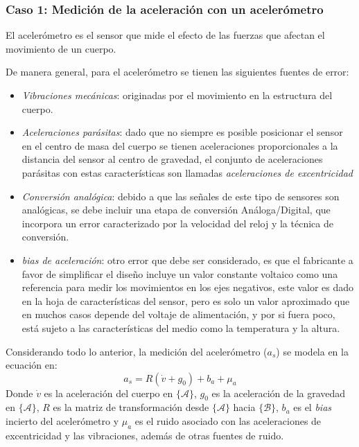 \documentclass[10pt]{report}
\numberwithin{equation}{chapter}
\numberwithin{algorithm}{chapter}
\newcommand{\bias}{\emph{bias} }
\newcommand{\marco}[1]{\{\mathcal{#1}\}}
\begin{document}
\subsubsection{Caso 1: Medición de la aceleración con un acelerómetro}
El acelerómetro es el sensor que mide el efecto de las fuerzas que afectan el movimiento de un cuerpo.\par
De manera general, para el acelerómetro se tienen las siguientes fuentes de error: 
\begin{itemize}
\item \emph{Vibraciones mecánicas}: originadas por el movimiento en la estructura del cuerpo.
\item \emph{Aceleraciones parásitas}: dado que no siempre es posible posicionar el sensor en el centro de masa del cuerpo se tienen aceleraciones proporcionales a la distancia del sensor al centro de gravedad, el conjunto de aceleraciones parásitas con estas características son llamadas \emph{aceleraciones de excentricidad}
\item \emph{Conversión analógica}: debido a que las señales de este tipo de sensores son analógicas, se debe incluir una etapa de conversión Análoga/Digital, que incorpora un error caracterizado por la velocidad del reloj y la técnica de conversión.
\item \emph{\bias de aceleración}: otro error que debe ser considerado, es que el fabricante a favor de simplificar el diseño incluye un valor constante voltaico como una referencia para medir los movimientos en los ejes negativos, este valor es dado en la hoja de características del sensor, pero es solo un valor aproximado que en muchos casos depende del voltaje de alimentación, y por si fuera poco, está sujeto a las características del medio como la temperatura y la altura.
\end{itemize} Considerando todo lo anterior, la medición del acelerómetro ($a_s$) se modela en la ecuación en: \begin{equation}
\label{ModeloEcc1}
a_s=R(\dot{v}+g_0)+b_a+\mu_a
\end{equation}
Donde $\dot{v}$ es la aceleración del cuerpo en $\marco{A}$, $g_0$ es la aceleración de la gravedad en $\marco{A}$, $R$ es la matriz de transformación desde $\marco{A}$ hacia $\marco{B}$, $b_a$ es el \emph{bias} incierto del acelerómetro y $\mu_a$ es el ruido asociado con las aceleraciones de excentricidad y las vibraciones, además de otras fuentes de ruido.
\end{document}
